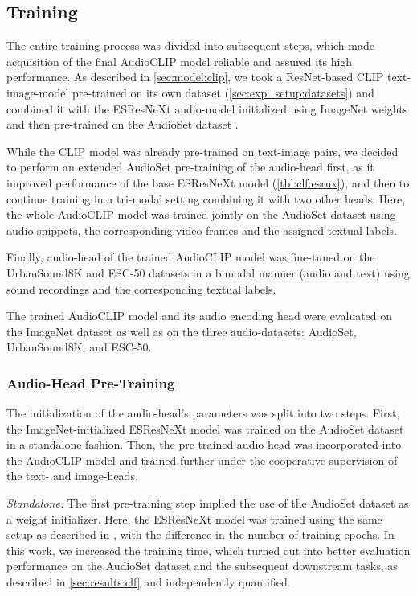 \documentclass[runningheads]{llncs}
\begin{document}
\subsection{Training} \label{sec:exp_setup:training}
The entire training process was divided into subsequent steps, which made acquisition of the final \mbox{AudioCLIP} model reliable and assured its high performance.
As described in \autoref{sec:model:clip}, we took a \mbox{ResNet}-based \mbox{CLIP} text-image-model pre-trained on its own dataset (\autoref{sec:exp_setup:datasets}) \cite{radford2021clip} and combined it with the \mbox{ESResNeXt} audio-model initialized using \mbox{ImageNet} weights and then pre-trained on the \mbox{AudioSet} dataset \cite{guzhov2021esrnx}.

While the CLIP model was already pre-trained on text-image pairs, we decided to perform an extended \mbox{AudioSet} pre-training of the audio-head first, as it improved performance of the base \mbox{ESResNeXt} model (\autoref{tbl:clf:esrnx}), and then to continue training in a tri-modal setting combining it with two other heads.
Here, the whole \mbox{AudioCLIP} model was trained jointly on the \mbox{AudioSet} dataset using audio snippets, the corresponding video frames and the assigned textual labels.

Finally, audio-head of the trained \mbox{AudioCLIP} model was fine-tuned on the \mbox{UrbanSound8K} and \mbox{ESC-50} datasets in a bimodal manner (audio and text) using sound recordings and the corresponding textual labels.

The trained \mbox{AudioCLIP} model and its audio encoding head were evaluated on the \mbox{ImageNet} dataset as well as on the three audio-datasets: \mbox{AudioSet}, \mbox{UrbanSound8K}, and \mbox{ESC-50}.

\subsubsection{Audio-Head Pre-Training} \label{sec:exp_setup:training:ah_training}
The initialization of the audio-head's parameters was split into two steps.
First, the \mbox{ImageNet}-initialized \mbox{ESResNeXt} model was trained on the \mbox{AudioSet} dataset in a standalone fashion.
Then, the pre-trained audio-head was incorporated into the \mbox{AudioCLIP} model and trained further under the cooperative supervision of the text- and image-heads.

\emph{Standalone:} The first pre-training step implied the use of the \mbox{AudioSet} dataset as a weight initializer.
Here, the \mbox{ESResNeXt} model was trained using the same setup as described in \cite{guzhov2021esrnx}, with the difference in the number of training epochs.
In this work, we increased the training time, which turned out into better evaluation performance on the \mbox{AudioSet} dataset and the subsequent downstream tasks, as described in \autoref{sec:results:clf} and independently quantified.
\end{document}

